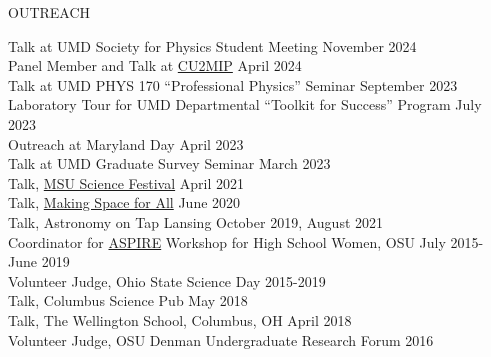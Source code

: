 \documentclass{resume} %
\begin{document}
\begin{rSection}{OUTREACH}

Talk at UMD Society for Physics Student Meeting  \hfill November 2024 \\
Panel Member and Talk at \href{https://cu2mip.physics.umd.edu}{CU2MIP}   \hfill April 2024 \\
Talk at UMD PHYS 170 ``Professional Physics'' Seminar \hfill September 2023 \\
Laboratory Tour for UMD Departmental ``Toolkit for Success'' Program \hfill July 2023 \\
Outreach at Maryland Day \hfill April 2023 \\
Talk at UMD Graduate Survey Seminar  \hfill March 2023 \\
Talk, \href{https://sciencefestival.msu.edu/schools/virtual-school-programs}{MSU Science Festival} \hfill April 2021 \\
Talk, \href{https://astronomy.osu.edu/events/making-space-all-chasing-ghost-particle}{Making Space for All} \hfill June 2020 \\
Talk, Astronomy on Tap Lansing \hfill October 2019, August 2021 \\
Coordinator for \href{u.osu.edu/aspire}{ASPIRE} Workshop for High School Women, OSU \hfill July 2015-June 2019\\
Volunteer Judge, Ohio State Science Day \hfill 2015-2019\\
Talk, Columbus Science Pub \hfill  May 2018\\
Talk, The Wellington School, Columbus, OH \hfill April 2018\\
Volunteer Judge, OSU Denman Undergraduate Research Forum \hfill 2016\\
\end{rSection}
\vspace{-0.30cm}
\end{document}
